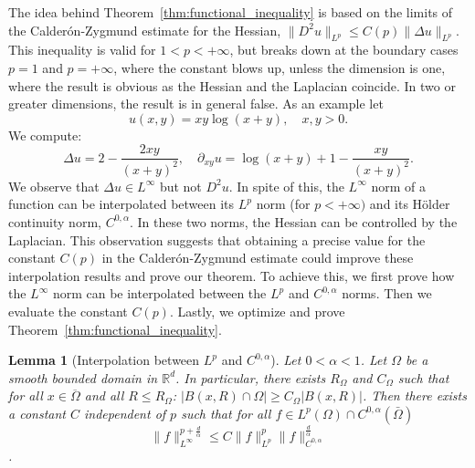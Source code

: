 \documentclass[a4paper,twosided, 11pt]{article}
\renewcommand{\color}[2][]{}
\newcommand{\R}{\mathbb{R}}
\newcommand {\f}   {\frac}
\newcommand {\p}   {\partial}
\theoremstyle{plain}
\newtheorem{lemma}[thm]{Lemma}
\theoremstyle{remark}
\numberwithin{equation}{section}
\begin{document}
The idea behind Theorem~\ref{thm:functional_inequality} is based on the limits of the Calderón-Zygmund estimate for the Hessian, $\|D^2 u \|_{L^p} \leq C(p)\|\Delta u\|_{L^p}$. This inequality is valid for $1 < p < +\infty$, but breaks down at the boundary cases $p = 1$ and $p = +\infty$, where the constant blows up, unless the dimension is one, where the result is obvious as the Hessian and the Laplacian coincide.  In two or greater  dimensions, the result is in general false. As an example let 
$$
u(x,y) = xy \log(x+y), \quad x,y>0. 
$$
We compute:
$$
\Delta u = 2 -\f{2 x y}{(x+y)^2}, \quad \p_{xy}u = \log(x+y) + 1 - \f{xy}{(x+y)^2}.                                       
$$
We observe that $\Delta u \in L^{\infty}$ but not $D^{2} u$. In spite of this, the $L^{\infty}$ norm of a function can be interpolated between its $L^p$ norm (for $p<+\infty)$ and its Hölder continuity norm, $C^{0,\alpha}$. In these two norms, the Hessian can be controlled by the Laplacian. This observation suggests that obtaining a precise value for the constant $C(p)$ in the Calderón-Zygmund estimate could improve these interpolation results and prove our theorem. To achieve this, we first prove how the $L^{\infty}$ norm can be interpolated between the $L^p$ and $C^{0,\alpha}$ norms. Then we evaluate the constant $C(p)$. Lastly, we optimize and prove Theorem~\ref{thm:functional_inequality}.

\begin{lemma}[Interpolation between $L^p$ and $C^{0,\alpha}$] \label{lem:interpolation_Lp_Calpha}
Let $0<\alpha<1$. Let $\Omega$ be a smooth bounded domain in $\R^d$.{\color{blue} In particular, there exists $R_{\Omega}$ and $C_{\Omega}$ such that for all $x\in \overline{\Omega}$ and all $R\le R_\Omega$: $|B(x,R)\cap \Omega|\ge C_{\Omega}|B(x,R)|$.} Then there exists a constant $C$ independent of $p$ such that for all $f\in L^{p}(\Omega)\cap C^{0,\alpha}(\bar{\Omega})$
$$
\|f\|_{L^{\infty}}^{p+\f{d}{\alpha}}\le C \|f\|_{L^{p}
}^{p}\|f\|_{C^{0,\alpha}}^{\f{d}{\alpha}}$$.
\end{lemma}
\end{document}
